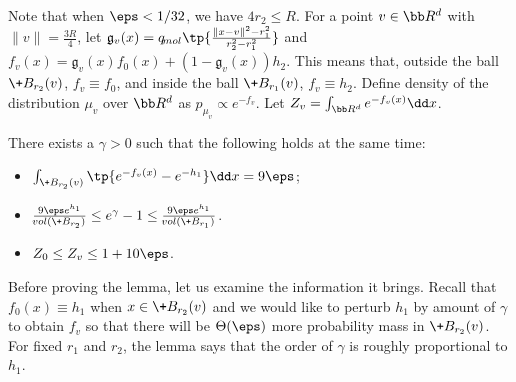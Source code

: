 Note that when $\eps<1/32$, we have $4r_2\leq R$. For a point $v\in \bb R^d$ with $\|v\|=\frac{3R}{4}$, let $\mathfrak{g}_v(x) = q_{\!{mol}}\tp{\frac{\|x-v\|^2-r_1^2}{r_2^2-r_1^2}}$ and $f_v(x)=\mathfrak{g}_v(x)f_0(x)+(1-\mathfrak{g}_v(x))h_2$. This means that, outside the ball $\+B_{r_2}(v)$, $f_v\equiv f_0$, and inside the ball $\+B_{r_1}(v)$, $f_v\equiv h_2$. Define density of the distribution $\mu_v$ over $\bb R^d$ as $p_{\mu_v}\propto e^{-f_v}$. Let $Z_v = \int_{\bb R^d} e^{-f_v(x)} \dd x$.

\begin{lemma}\label{lem:gamma}
    There exists a $\gamma>0$ such that the following holds at the same time:
    \begin{itemize}
        \item  $\int_{\+B_{r_2}(v)} \tp{e^{-f_v(x)} - e^{-h_1}}  \dd x = 9\eps$;
        \item $\frac{9\eps e^{h_1}}{\!{vol}(\+B_{r_2})}\le e^\gamma-1 \le \frac{9\eps e^{h_1}}{\!{vol}(\+B_{r_1})}$.
        \item $Z_0\leq Z_v\leq 1+10\eps$.
    \end{itemize}
\end{lemma}

Before proving the lemma, let us examine the information it brings. Recall that $f_0(x)\equiv h_1$ when $x\in \+B_{r_2}(v)$ and we would like to perturb $h_1$ by amount of $\gamma$ to obtain $f_v$ so that there will be $\Theta(\eps)$ more probability mass in $\+B_{r_2}(v)$. For fixed $r_1$ and $r_2$, the lemma says that the order of $\gamma$ is roughly proportional to $h_1$. 

